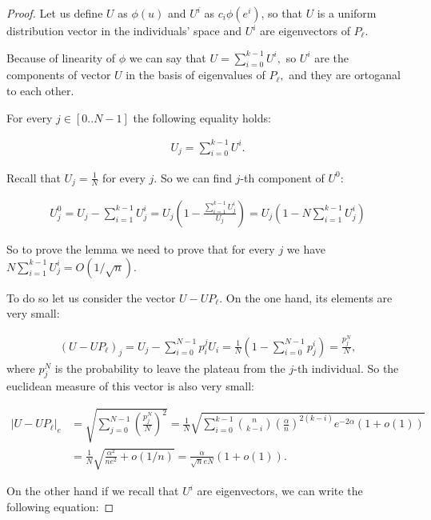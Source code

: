 \documentclass{article}
\begin{document}
\begin{proof}

Let us define $U$ as $\phi(u)$ and $U^i$ as $c_i\phi(e^i)$, so that $U$ is a uniform distribution vector in the individuals' space and $U^i$ are eigenvectors of $P_\ell.$

Because of linearity of $\phi$ we can say that $U = \sum\limits_{i = 0}^{k - 1} U^i,$ so $U^i$ are the components of vector $U$ in the basis of eigenvalues of $P_\ell,$ and they are ortoganal to each other.

For every $j \in [0..N-1]$ the following equality holds:

\begin{align*}
  U_j = \sum\limits_{i = 0}^{k - 1} U^i.
\end{align*}

Recall that $U_j = \frac{1}{N}$ for every $j.$ So we can find $j$-th component of $U^0:$

\begin{align*}
  U_j^0 = U_j - \sum\limits_{i = 1}^{k - 1} U_j^i = U_j \left(1 - \frac{\sum\limits_{i = 1}^{k - 1} U_j^i}{U_j}\right) = U_j \left(1 - N\sum\limits_{i = 1}^{k - 1} U_j^i\right)
\end{align*}

So to prove the lemma we need to prove that for every $j$ we have $N\sum\limits_{i = 1}^{k - 1} U_j^i = O(1/\sqrt{n}).$

To do so let us consider the vector $U - UP_\ell.$ On the one hand, its elements are very small:

\begin{align*}
  (U - UP_\ell)_j = U_j - \sum\limits_{i = 0}^{N - 1} p_i^j U_i = \frac{1}{N} \left( 1 - \sum\limits_{i = 0}^{N - 1} p_j^i\right) = \frac{p_j^N}{N},
\end{align*}
where $p_j^N$ is the probability to leave the plateau from the $j$-th individual. So the euclidean measure of this vector is also very small:

\begin{align*}
|U - UP_\ell|_e &= \sqrt{\sum\limits_{j = 0}^{N - 1} \left(\frac{p_j^N}{N}\right)^2} = \frac{1}{N} \sqrt{\sum\limits_{i = 0}^{k - 1} \binom{n}{k - i} \left(\frac{\alpha}{n}\right)^{2(k - i)} e^{-2\alpha} (1 + o(1))} \\
&= \frac{1}{N} \sqrt{\frac{\alpha^2}{ne^2} + o(1/n)} = \frac{\alpha}{\sqrt{n}eN} (1 + o(1)).
\end{align*}

On the other hand if we recall that $U^i$ are eigenvectors, we can write the following equation:


\end{proof}
\end{document}
